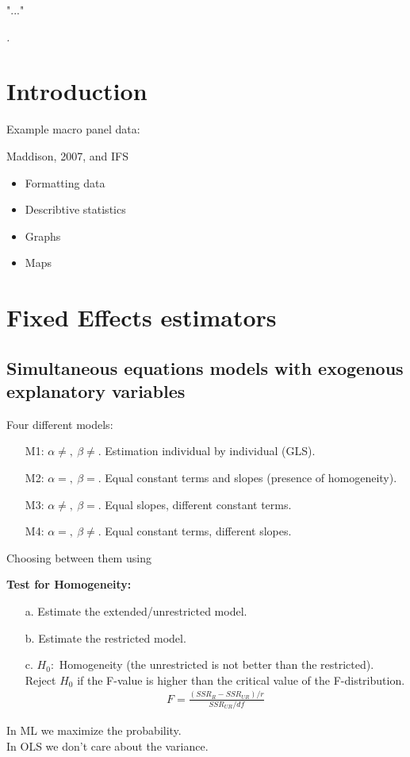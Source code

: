 \epigraph{"..."}
{\textit{.}}

\begin{multicols}{2}
\section{Introduction}
Example macro panel data:\par
Maddison, 2007, and IFS
\begin{itemize}
  \item Formatting data
  \item Describtive statistics
  \item Graphs
  \item Maps
\end{itemize}
\section{Fixed Effects estimators} %
\subsection{Simultaneous equations models with exogenous explanatory variables}
Four different models:
\begin{itemize}
  \item[M1:] $\alpha\neq,\ \beta\neq.$ Estimation individual by individual (GLS).
  \item[M2:] $\alpha=,\ \beta=.$ Equal constant terms and slopes (presence of homogeneity).
  \item[M3:] $\alpha\neq,\ \beta=.$ Equal slopes, different constant terms.
  \item[M4:] $\alpha=,\ \beta\neq.$ Equal constant terms, different slopes.
\end{itemize}
Choosing between them using\par
\textbf{Test for Homogeneity:}
\begin{itemize}
  \item[a.] Estimate the extended/unrestricted model.
  \item[b.] Estimate the restricted model.
  \item[c.] $H_0:$ Homogeneity (the unrestricted is not better than the restricted).\\
  Reject $H_0$ if the F-value is higher than the critical value of the F-distribution.
  \begin{align*}
    F = \frac{(SSR_R-SSR_{UR})/r}{SSR_{UR}/df}
  \end{align*}
\end{itemize}
In ML we maximize the probability.\\
In OLS we don't care about the variance.


\end{multicols}
